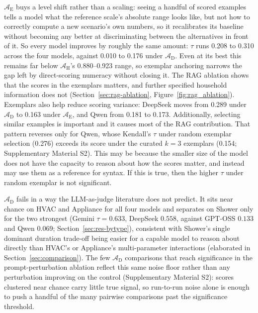 \documentclass[final,3p,times]{elsarticle}
\begin{document}
$\mathcal{A}_{\text{E}}$ buys a level shift rather than a scaling: seeing a handful of scored examples tells a model what the reference scale's absolute range looks like, but not how to correctly compute a new scenario's own numbers, so it recalibrates its baseline without becoming any better at discriminating between the alternatives in front of it. So every model improves by roughly the same amount: $\tau$ runs 0.208 to 0.310 across the four models, against 0.010 to 0.176 under $\mathcal{A}_{\text{D}}$. Even at its best this remains far below $\mathcal{A}_{\text{H}}$'s 0.880--0.923 range, so exemplar anchoring narrows the gap left by direct-scoring numeracy without closing it. The RAG ablation shows that the scores in the exemplars matters, and further specified household information does not (Section~\ref{sec:rag-ablation}, Figure~\ref{fig:rag_ablation}). Exemplars also help reduce scoring variance: DeepSeek moves from 0.289 under $\mathcal{A}_{\text{D}}$ to 0.163 under $\mathcal{A}_{\text{E}}$, and Qwen from 0.181 to 0.173. Additionally, selecting similar examples is important and it causes most of the RAG contribution. That pattern reverses only for Qwen, whose Kendall's $\tau$ under random exemplar selection (0.276) exceeds its score under the curated $k=3$ exemplars (0.154; Supplementary Material S2). This may be because the smaller size of the model does not have the capacity to reason about how the scores matter, and instead may use them as a reference for syntax. If this is true, then the higher $\tau$ under random exemplar is not significant.

$\mathcal{A}_{\text{D}}$ fails in a way the LLM-as-judge literature does not predict. It sits near chance on HVAC and Appliance for all four models and separates on Shower only for the two strongest (Gemini $\tau = 0.633$, DeepSeek $0.558$, against GPT-OSS $0.133$ and Qwen $0.069$; Section~\ref{sec:res-bytype}), consistent with Shower's single dominant duration trade-off being easier for a capable model to reason about directly than HVAC's or Appliance's multi-parameter interactions (elaborated in Section~\ref{sec:comparison}). The few $\mathcal{A}_{\text{D}}$ comparisons that reach significance in the prompt-perturbation ablation reflect this same noise floor rather than any perturbation improving on the control (Supplementary Material S2): scores clustered near chance carry little true signal, so run-to-run noise alone is enough to push a handful of the many pairwise comparisons past the significance threshold.
\end{document}
